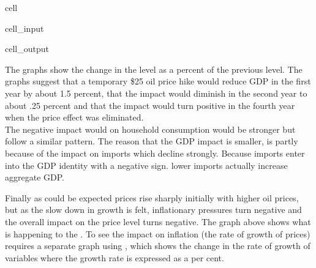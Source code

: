 \documentclass[letterpaper,10pt,english]{jupyterBook}
\begin{document}
\begin{sphinxuseclass}{cell}\begin{sphinxVerbatimInput}

\begin{sphinxuseclass}{cell_input}
\begin{sphinxVerbatim}[commandchars=\\\{\}]
\PYG{p}{[}\PYG{p}{]}
\end{sphinxVerbatim}

\end{sphinxuseclass}\end{sphinxVerbatimInput}
\begin{sphinxVerbatimOutput}

\begin{sphinxuseclass}{cell_output}
\noindent{}

\noindent{}

\end{sphinxuseclass}\end{sphinxVerbatimOutput}

\end{sphinxuseclass}
\sphinxAtStartPar
The graphs show the change in the level as a percent of the previous level. The graphs suggest that a temporary \$25 oil price hike would reduce GDP in the first year by about 1.5 percent, that the impact would diminish in the second year to about \sphinxhyphen{}.25 percent and that the impact would turn positive in the fourth year when the price effect was eliminated.\\
The negative impact would on household consumption would be stronger but follow a similar pattern.  The reason that the GDP impact is smaller, is partly because of the impact on imports which decline strongly.  Because imports enter into the GDP identity with a negative sign. lower imports actually increase aggregate GDP.

\sphinxAtStartPar
Finally as could be expected prices rise sharply initially with higher oil prices, but as the slow down in growth is felt, inflationary pressures turn negative and the overall impact on the price level turns negative.  The graph above shows what is happening to the . To see the impact on inflation (the rate of growth of prices) requires a separate graph using , which shows the change in the rate of growth of variables where the growth rate is expressed as a per cent.
\end{document}
